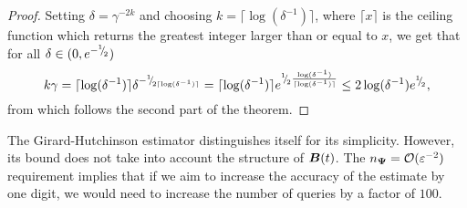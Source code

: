 \documentclass[12pt]{article}
\begin{document}
\begin{proof}
    Setting $\delta = \gamma^{-2 k}$ and choosing $k = \lceil \log(\delta^{-1}) \rceil$, where $\lceil x \rceil$ is the ceiling function which returns the greatest integer larger than or equal to $x$, we get that for all $\delta \in (0, e^{-{}^{1}{\mskip -5mu/\mskip -3mu}_{2}})$
    \begin{equation}
        k \gamma = \lceil \log(\delta^{-1}) \rceil \delta^{-{}^{1}{\mskip -5mu/\mskip -3mu}_{2\lceil \log(\delta^{-1}) \rceil}}
        = \lceil \log(\delta^{-1}) \rceil e^{{}^{1}{\mskip -5mu/\mskip -3mu}_{2}\frac{\log(\delta^{-1})}{\lceil \log(\delta^{-1}) \rceil}}
        \leq 2 \log(\delta^{-1}) e^{{}^{1}{\mskip -5mu/\mskip -3mu}_{2}},
    \end{equation}
    from which follows the second part of the theorem.
\end{proof}


The Girard-Hutchinson estimator distinguishes itself for its simplicity. However, its bound does not take into account the structure of $\boldsymbol{B}(t)$. The $n_{\boldsymbol{\Psi}} = \mathcal{O}(\varepsilon^{-2})$ requirement implies that if we aim to increase the accuracy of the estimate by one digit, we would need to increase the number of queries by a factor of $100$. 
\end{document}
